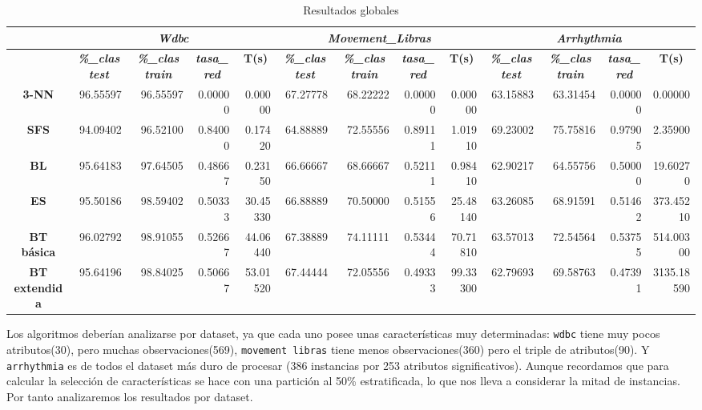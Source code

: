 \documentclass[a4paper,11pt]{article}
\begin{document}
  
  \begin{table}[H]
  \caption*{Resultados globales}
  \begin{adjustbox}{width=1.1\textwidth}
  \begin{tabular}{|c|r|r|r|r|r|r|r|r|r|r|r|r|}
  \hline
  \multicolumn{1}{|l|}{} & \multicolumn{ 4}{c|}{\textbf{\textit{Wdbc}}} & \multicolumn{ 4}{c|}{\textbf{\textit{Movement\_Libras}}} & \multicolumn{ 4}{c|}{\textbf{\textit{Arrhythmia}}} \\ \hline
  & \multicolumn{1}{c|}{\textbf{\textit{\%\_clas test}}} & \multicolumn{1}{c|}{\textbf{\textit{\%\_clas train}}} & \multicolumn{1}{c|}{\textbf{\textit{tasa\_red}}} & \multicolumn{1}{c|}{\textbf{T(s)}} & \multicolumn{1}{c|}{\textbf{\textit{\%\_clas test}}} & \multicolumn{1}{c|}{\textbf{\textit{\%\_clas train}}} & \multicolumn{1}{c|}{\textbf{\textit{tasa\_red}}} & \multicolumn{1}{c|}{\textbf{T(s)}} & \multicolumn{1}{c|}{\textbf{\textit{\%\_clas test}}} & \multicolumn{1}{c|}{\textbf{\textit{\%\_clas train}}} & \multicolumn{1}{c|}{\textbf{\textit{tasa\_red}}} & \multicolumn{1}{c|}{\textbf{T(s)}} \\ \hline
  \textbf{3-NN} & 96.55597 & 96.55597 & 0.00000 & 0.00000 & 67.27778 & 68.22222 & 0.00000 & 0.00000 & 63.15883 & 63.31454 & 0.00000 & 0.00000 \\ \hline
  \textbf{SFS} & 94.09402 & 96.52100 & 0.84000 & 0.17420 & 64.88889 & 72.55556 & 0.89111 & 1.01910 & 69.23002 & 75.75816 & 0.97905 & 2.35900 \\ \hline
  \textbf{BL} & 95.64183 & 97.64505 & 0.48667 & 0.23150 & 66.66667 & 68.66667 & 0.52111 & 0.98410 & 62.90217 & 64.55756 & 0.50000 & 19.60270 \\ \hline
  \textbf{ES} & 95.50186 & 98.59402 & 0.50333 & 30.45330 & 66.88889 & 70.50000 & 0.51556 & 25.48140 & 63.26085 & 68.91591 & 0.51462 & 373.45210 \\ \hline
  \textbf{BT básica} & 96.02792 & 98.91055 & 0.52667 & 44.06440 & 67.38889 & 74.11111 & 0.53444 & 70.71810 & 63.57013 & 72.54564 & 0.53755 & 514.00300 \\ \hline
  \textbf{BT extendida} & 95.64196 & 98.84025 & 0.50667 & 53.01520 & 67.44444 & 72.05556 & 0.49333 & 99.33300 & 62.79693 & 69.58763 & 0.47391 & 3135.18590 \\ \hline
  \end{tabular}
  \end{adjustbox}
  \label{}
  \end{table}

  
  Los algoritmos deberían analizarse por dataset, ya que cada uno posee unas características muy determinadas: \texttt{wdbc} tiene muy pocos atributos(30), pero muchas observaciones(569),
  \texttt{movement libras} tiene menos observaciones(360) pero el triple de atributos(90). Y \texttt{arrhythmia} es de todos el dataset más duro de procesar (386 instancias por 253 atributos
  significativos). Aunque recordamos que para calcular la selección de características se hace con una partición al 50\% estratificada, lo que nos lleva a considerar la mitad de instancias.
  Por tanto analizaremos los resultados por dataset.
  
\end{document}
